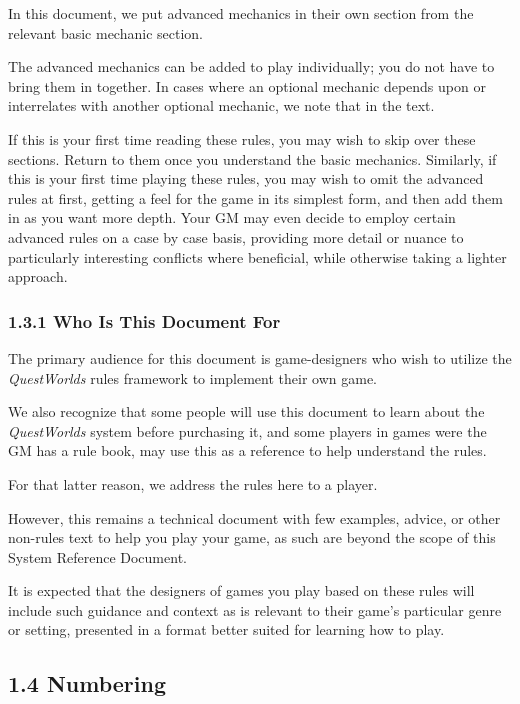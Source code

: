 \documentclass[
]{article}
\begin{document}
In this document, we put advanced mechanics in their own section from
the relevant basic mechanic section.

The advanced mechanics can be added to play individually; you do not
have to bring them in together. In cases where an optional mechanic
depends upon or interrelates with another optional mechanic, we note
that in the text.

If this is your first time reading these rules, you may wish to skip
over these sections. Return to them once you understand the basic
mechanics. Similarly, if this is your first time playing these rules,
you may wish to omit the advanced rules at first, getting a feel for the
game in its simplest form, and then add them in as you want more depth.
Your GM may even decide to employ certain advanced rules on a case by
case basis, providing more detail or nuance to particularly interesting
conflicts where beneficial, while otherwise taking a lighter approach.

\hypertarget{who-is-this-document-for}{%
\subsubsection{1.3.1 Who Is This Document
For}\label{who-is-this-document-for}}

The primary audience for this document is game-designers who wish to
utilize the \emph{QuestWorlds} rules framework to implement their own
game.

We also recognize that some people will use this document to learn about
the \emph{QuestWorlds} system before purchasing it, and some players in
games were the GM has a rule book, may use this as a reference to help
understand the rules.

For that latter reason, we address the rules here to a player.

However, this remains a technical document with few examples, advice, or
other non-rules text to help you play your game, as such are beyond the
scope of this System Reference Document.

It is expected that the designers of games you play based on these rules
will include such guidance and context as is relevant to their game's
particular genre or setting, presented in a format better suited for
learning how to play.

\hypertarget{numbering}{%
\subsection{1.4 Numbering}\label{numbering}}
\end{document}

